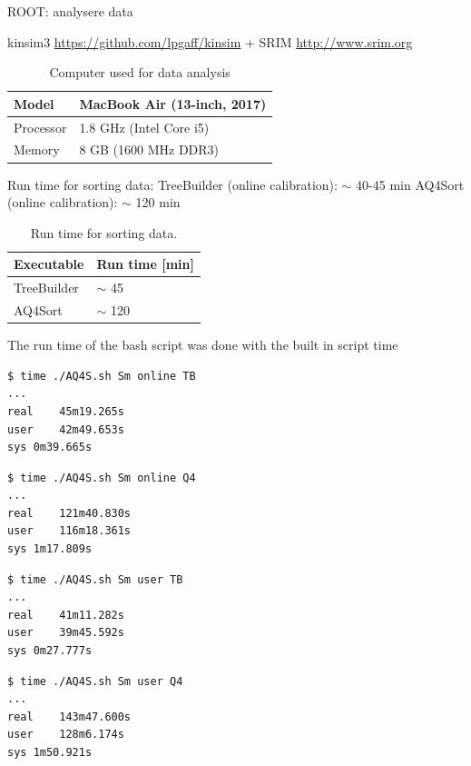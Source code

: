 \documentclass[twoside,english]{uiofysmaster/uiofysmaster}
\begin{document}
\bigskip

ROOT: analysere data

kinsim3 \url{https://github.com/lpgaff/kinsim} + SRIM \url{http://www.srim.org}

\bigskip


\begin{table}[H] 
\centering 
\caption{Computer used for data analysis}
\label{tab:PC}
\begin{tabular}{ll}
\hline
Model & MacBook Air (13-inch, 2017) \\
\hline
Processor & 1.8 GHz (Intel Core i5) \\
Memory & 8 GB (1600 MHz DDR3) \\
\hline
\end{tabular}
\end{table}

Run time for sorting data: \newline
TreeBuilder (online calibration): $\sim$ 40-45 min \newline
AQ4Sort (online calibration): $\sim$ 120 min

\begin{table}[H] 
\centering 
\caption{Run time for sorting data.}
\label{tab:run_time}
\begin{tabular}{ll}
\hline
Executable & Run time [min] \\
\hline
TreeBuilder & $\sim$ 45 \\
AQ4Sort & $\sim$ 120 \\
\hline
\end{tabular}
\end{table}

The run time of the bash script was done with the built in script time

\begin{lstlisting}[language=sh]
$ time ./AQ4S.sh Sm online TB
...
real	45m19.265s
user	42m49.653s
sys	0m39.665s
\end{lstlisting}


\begin{lstlisting}[language=sh]
$ time ./AQ4S.sh Sm online Q4
...
real	121m40.830s
user	116m18.361s
sys	1m17.809s
\end{lstlisting}


\begin{lstlisting}[language=sh]
$ time ./AQ4S.sh Sm user TB
...
real	41m11.282s
user	39m45.592s
sys	0m27.777s
\end{lstlisting}


\begin{lstlisting}[language=sh]
$ time ./AQ4S.sh Sm user Q4
...
real	143m47.600s
user	128m6.174s
sys	1m50.921s
\end{lstlisting}
\end{document}
